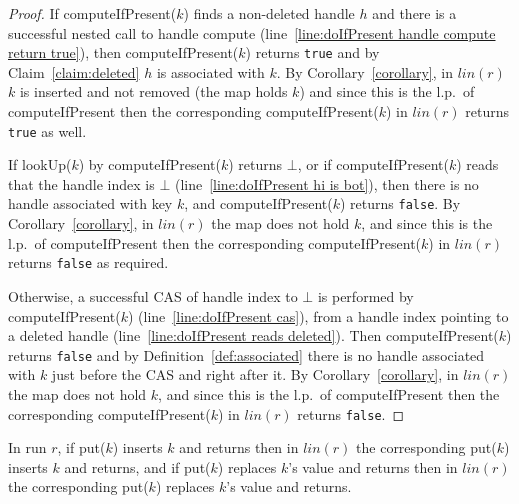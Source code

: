 \begin{proof}
If computeIfPresent($k$) finds a non-deleted handle $h$ and there is a successful nested call to handle compute (line~\ref{line:doIfPresent handle compute return true}), then computeIfPresent($k$) returns \texttt{true} and by Claim~\ref{claim:deleted} $h$ is associated with $k$. 
By Corollary~\ref{corollary}, in $lin(r)$ $k$ is inserted and not removed (the map holds $k$) and since this is the l.p.\ of computeIfPresent then the corresponding computeIfPresent($k$) in $lin(r)$ returns \texttt{true} as well.

If lookUp($k$) by computeIfPresent($k$) returns $\bot$, or if \newline computeIfPresent($k$) reads that the handle index is $\bot$ (line~\ref{line:doIfPresent hi is bot}), then there is no handle associated with key $k$, and \newline computeIfPresent($k$) returns \texttt{false}.
By Corollary~\ref{corollary}, in $lin(r)$ the map does not hold $k$, and since this is the l.p.\ of computeIfPresent then the corresponding computeIfPresent($k$) in $lin(r)$ returns \texttt{false} as required.

Otherwise, a successful CAS of handle index to $\bot$ is performed by computeIfPresent($k$) (line~\ref{line:doIfPresent cas}), from a handle index pointing to a deleted handle (line~\ref{line:doIfPresent reads deleted}).
Then computeIfPresent($k$) returns \texttt{false} and by Definition~\ref{def:associated} there is no handle associated with $k$ just before the CAS and right after it. 
By Corollary~\ref{corollary}, in $lin(r)$ the map does not hold $k$, and since this is the l.p.\ of computeIfPresent then the corresponding computeIfPresent($k$) in $lin(r)$ returns \texttt{false}.
\end{proof}

\begin{claim}[Put]
In run $r$, if put($k$) inserts $k$ and returns then in $lin(r)$ the corresponding put($k$) inserts $k$ and returns, and if put($k$) replaces $k$'s value and returns then in $lin(r)$ the corresponding put($k$) replaces $k$'s value and returns.
\end{claim}

